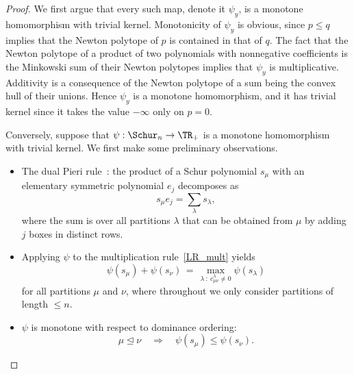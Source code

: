\begin{proof}
	We first argue that every such map, denote it $\psi_y$, is a monotone homomorphism with trivial kernel.
	Monotonicity of $\psi_y$ is obvious, since $p \le q$ implies that the Newton polytope of $p$ is contained in that of $q$.
	The fact that the Newton polytope of a product of two polynomials with nonnegative coefficients is the Minkowski sum of their Newton polytopes implies that $\psi_y$ is multiplicative.
	Additivity is a consequence of the Newton polytope of a sum being the convex hull of their unions.
	Hence $\psi_y$ is a monotone homomorphism, and it has trivial kernel since it takes the value $-\infty$ only on $p = 0$.

	Conversely, suppose that $\psi : \Schur_n \to \TR_+$ is a monotone homomorphism with trivial kernel.
	We first make some preliminary observations.
	\begin{itemize}
		\item The dual Pieri rule~\cite[p.~340]{stanley2}: the product of a Schur polynomial $s_\mu$ with an elementary symmetric polynomial $e_j$ decomposes as
			\begin{equation}
				\label{se_prod}
				s_\mu e_j = \sum_\lambda s_\lambda,
			\end{equation}
			where the sum is over all partitions $\lambda$ that can be obtained from $\mu$ by adding $j$ boxes in distinct rows.
		\item Applying $\psi$ to the multiplication rule~\eqref{LR_mult} yields
			\begin{equation}
				\label{psiadd}
				\psi(s_\mu) + \psi(s_\nu) \,=\, \max_{\lambda \: : \:  c^\lambda_{\mu\nu} \neq 0} \psi(s_\lambda)
			\end{equation}
			for all partitions $\mu$ and $\nu$, where throughout we only consider partitions of length $\le n$.
		\item $\psi$ is monotone with respect to dominance ordering:
			\[
				\mu \trianglelefteq \nu \quad \Longrightarrow \quad \psi(s_\mu) \le \psi(s_\nu).
			\]
			

\end{itemize}
\end{proof}

